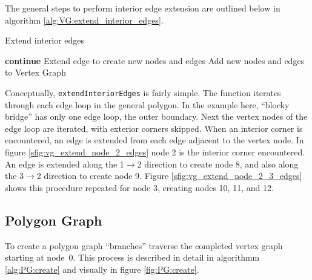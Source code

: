 The general steps to perform interior edge extension are outlined below in algorithm \ref{alg:VG:extend_interior_edges}.

\begin{algorithm}[htb]
\caption{Extend interior edges}\label{alg:VG:extend_interior_edges}
\begin{algorithmic}[1]
				\State \textbf{continue}
			\EndIf
				\State Extend edge to create new nodes and edges
				\State Add new nodes and edges to Vertex Graph
			\EndFor
		\EndFor
	\EndFor
\EndFunction
\end{algorithmic}
\end{algorithm}

Conceptually, \verb|extendInteriorEdges| is fairly simple.
The function iterates through each edge loop in the general polygon.
In the example here, ``blocky bridge'' has only one edge loop, the outer boundary.
Next the vertex nodes of the edge loop are iterated, with exterior corners skipped.
When an interior corner is encountered, an edge is extended from each edge adjacent to the vertex node.
In figure \ref{sfig:vg_extend_node_2_edges} node 2 is the interior corner encountered.
An edge is extended along the 1$\rightarrow$2 direction to create node 8, and also along the 3$\rightarrow$2 direction to create node 9.
Figure \ref{sfig:vg_extend_node_2_3_edges} shows this procedure repeated for node 3, creating nodes 10, 11, and 12.

\subsection{Polygon Graph}
To create a polygon graph ``branches'' traverse the completed vertex graph starting at node~0.
This process is described in detail in algorithmm \ref{alg:PG:create} and visually in figure \ref{fig:PG:create}.

